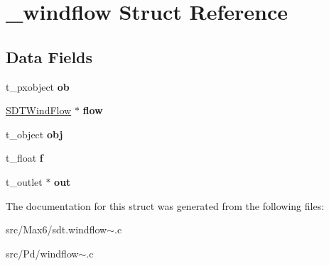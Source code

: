 \hypertarget{struct__windflow}{}\section{\+\_\+windflow Struct Reference}
\label{struct__windflow}
\subsection*{Data Fields}
\begin{DoxyCompactItemize}
\item 
\hypertarget{struct__windflow_a55b4380edb216f04a1c42b9095594963}{}t\+\_\+pxobject {\bfseries ob}\label{struct__windflow_a55b4380edb216f04a1c42b9095594963}

\item 
\hypertarget{struct__windflow_a7667b9c2034ade12de6fa9c8db6f2d16}{}\hyperlink{struct_s_d_t_wind_flow}{S\+D\+T\+Wind\+Flow} $\ast$ {\bfseries flow}\label{struct__windflow_a7667b9c2034ade12de6fa9c8db6f2d16}

\item 
\hypertarget{struct__windflow_a21775ab6bc98b0961a6e9fd9d832e65b}{}t\+\_\+object {\bfseries obj}\label{struct__windflow_a21775ab6bc98b0961a6e9fd9d832e65b}

\item 
\hypertarget{struct__windflow_a73198eb29c82f0df575e45396b68c18c}{}t\+\_\+float {\bfseries f}\label{struct__windflow_a73198eb29c82f0df575e45396b68c18c}

\item 
\hypertarget{struct__windflow_a07b901a5d7d4140b7f701a94bf7f245c}{}t\+\_\+outlet $\ast$ {\bfseries out}\label{struct__windflow_a07b901a5d7d4140b7f701a94bf7f245c}

\end{DoxyCompactItemize}


The documentation for this struct was generated from the following files\+:\begin{DoxyCompactItemize}
\item 
src/\+Max6/sdt.\+windflow$\sim$.\+c\item 
src/\+Pd/windflow$\sim$.\+c\end{DoxyCompactItemize}
